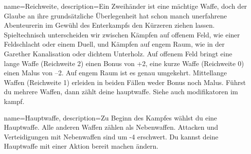 {
    name={Reichweite},
    description={Ein Zweihänder ist eine mächtige Waffe, doch der Glaube an ihre grundsätzliche Überlegenheit hat schon manch unerfahrene Abenteurerin im Gewühl des Enterkampfs den Kürzeren ziehen lassen. Spieltechnisch unterscheiden wir zwischen Kämpfen auf offenem Feld, wie einer Feldschlacht oder einem Duell, und Kämpfen auf engem Raum, wie in der Garether Kanalisation oder dichtem Unterholz. Auf offenem Feld bringt eine lange Waffe (Reichweite 2) einen Bonus von +2, eine kurze Waffe (Reichweite 0) einen Malus von –2. Auf engem Raum ist es genau umgekehrt. Mittellange Waffen (Reichweite 1) erleiden in beiden Fällen weder Bonus noch Malus. Führst du mehrere Waffen, dann zählt deine \gls{hauptwaffe}. Siehe auch \gls{modifikatoren im kampf}.}}

{
    name={Hauptwaffe},
    description={Zu Beginn des Kampfes wählst du eine Hauptwaffe. Alle anderen Waffen zählen als Nebenwaffen. Attacken und Verteidigungen mit Nebenwaffen sind um -4 erschwert. Du kannst deine Hauptwaffe mit einer Aktion \gls{bereit machen} ändern.}}

